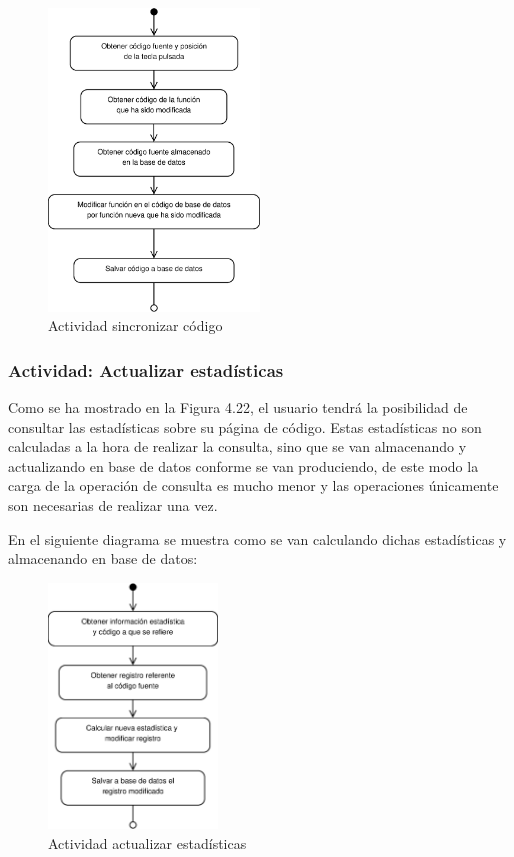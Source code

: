 \begin{figure}[h]
	\centering
	\includegraphics[width=0.5\textwidth]{./img/DiagramaA6.eps}
	\caption{Actividad sincronizar código}
\end{figure}

\newpage
\subsubsection{Actividad: Actualizar estadísticas}

Como se ha mostrado en la Figura 4.22, el usuario tendrá la posibilidad de consultar las estadísticas sobre su página de código. Estas estadísticas no son calculadas a la hora de realizar la consulta, sino que se van almacenando y actualizando en base de datos conforme se van produciendo, de este modo la carga de la operación de consulta es mucho menor y las operaciones únicamente son necesarias de realizar una vez. 

En el siguiente diagrama se muestra como se van calculando dichas estadísticas y almacenando en base de datos:

\begin{figure}[h]
	\centering
	\includegraphics[width=0.4\textwidth]{./img/DiagramaA7.eps}
	\caption{Actividad actualizar estadísticas}
\end{figure}

